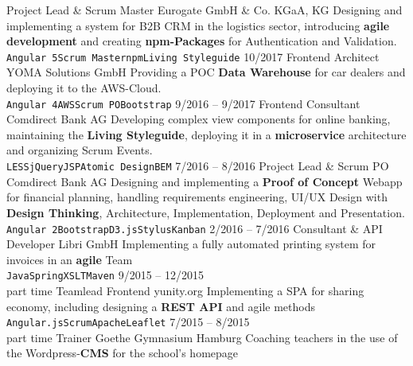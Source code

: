 \documentclass[9pt]{developercv} %
\begin{document}
\begin{entrylist}
		{Project Lead \& Scrum Master}
		{Eurogate GmbH \& Co. KGaA, KG}
		{
      Designing and implementing a system for B2B CRM in the logistics sector, introducing \textbf{agile development} and 
      creating \textbf{npm-Packages} for Authentication and Validation.\\ 
      \texttt{Angular 5}\slashsep\texttt{Scrum Master}\slashsep\texttt{npm}\slashsep\texttt{Living Styleguide}
    }
  \entry
		{10/2017}
		{Frontend Architect}
		{YOMA Solutions GmbH}
		{
      Providing a POC \textbf{Data Warehouse} for car dealers and deploying it to the AWS-Cloud.\\
      \texttt{Angular 4}\slashsep\texttt{AWS}\slashsep\texttt{Scrum PO}\slashsep\texttt{Bootstrap}
    }
  \entry
		{9/2016 -- 9/2017}
		{Frontend Consultant}
		{Comdirect Bank AG}
		{
      Developing complex view components for online banking, maintaining the \textbf{Living Styleguide},
      deploying it in a \textbf{microservice} architecture and organizing Scrum Events.\\
      \texttt{LESS}\slashsep\texttt{jQuery}\slashsep\texttt{JSP}\slashsep\texttt{Atomic Design}\slashsep\texttt{BEM}
    }
  \entry
		{7/2016 -- 8/2016}
		{Project Lead \& Scrum PO}
		{Comdirect Bank AG}
		{
      Designing and implementing a \textbf{Proof of Concept} Webapp for financial planning, handling
      requirements engineering, UI/UX Design with \textbf{Design Thinking}, Architecture, Implementation, Deployment
      and Presentation.\\
      \texttt{Angular 2}\slashsep\texttt{Bootstrap}\slashsep\texttt{D3.js}\slashsep\texttt{Stylus}\slashsep\texttt{Kanban}
    }
  \entry
		{2/2016 -- 7/2016}
		{Consultant \& API Developer}
		{Libri GmbH}
		{
      Implementing a fully automated printing system for invoices in an \textbf{agile} Team\\
      \texttt{Java}\slashsep\texttt{Spring}\slashsep\texttt{XSLT}\slashsep\texttt{Maven}
    }
  \entry
		{9/2015 -- 12/2015\\\footnotesize{part time}}
		{Teamlead Frontend}
		{yunity.org}
		{
      Implementing a SPA for sharing economy, including designing a \textbf{REST API} and agile methods\\
      \texttt{Angular.js}\slashsep\texttt{Scrum}\slashsep\texttt{Apache}\slashsep\texttt{Leaflet}
    }
  \entry
		{7/2015 -- 8/2015\\\footnotesize{part time}}
		{Trainer}
		{Goethe Gymnasium Hamburg}
		{
      Coaching teachers in the use of the Wordpress-\textbf{CMS} for the school's homepage\\
}
\end{entrylist}
\end{document}
